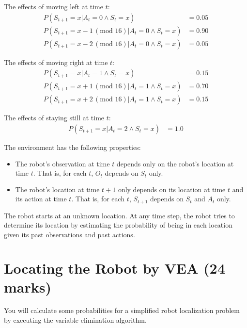 \documentclass[12pt]{article}
\begin{document}
The effects of moving left at time $t$:
%
\begin{align}
P(S_{t+1} = x | A_t = 0\land S_t = x) & = 0.05\\    
P(S_{t+1} = x - 1 \,(\text{mod } 16) | A_t = 0 \land S_t = x) & = 0.90\\    
P(S_{t+1} = x - 2 \,(\text{mod } 16)| A_t = 0 \land S_t = x) & = 0.05
\end{align}

The effects of moving right at time $t$:
\begin{align}
P(S_{t+1} = x | A_t = 1\land S_t = x) & = 0.15\\    
P(S_{t+1} = x + 1 \,(\text{mod } 16) | A_t = 1 \land S_t = x) & = 0.70\\    
P(S_{t+1} = x + 2 \,(\text{mod } 16)| A_t = 1 \land S_t = x) & = 0.15  
\end{align}

The effects of staying still at time $t$:
\begin{align}
P(S_{t+1} = x | A_t = 2\land S_t = x) & = 1.0
\end{align}

The environment has the following properties:
\begin{itemize}

\item The robot's observation at time $t$ depends only on the robot's location at time $t$. That is, for each $t$, $O_t$ depends on $S_t$ only.

\item The robot's location at time $t + 1$ only depends on its location at time $t$ and its action at time $t$. That is, for each $t$, $S_{t+1}$ depends on $S_t$ and $A_t$ only. 
\end{itemize}

The robot starts at an unknown location. At any time step, the robot tries to determine its location by estimating the probability of being in each location given its past observations and past actions. 





\newpage
\section{Locating the Robot by VEA (24 marks)}

You will calculate some probabilities for a simplified robot localization problem by executing the variable elimination algorithm.
\end{document}
